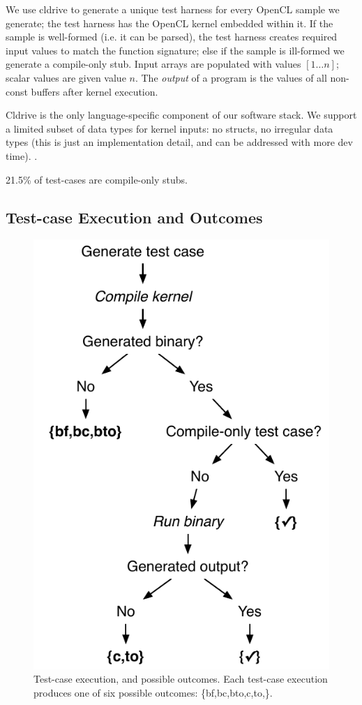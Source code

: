We use cldrive to generate a unique test harness for every OpenCL sample we generate; the test harness has the OpenCL kernel embedded within it. If the sample is well-formed (i.e. it can be parsed), the test harness creates required input values to match the function signature; else if the sample is ill-formed we generate a compile-only stub. Input arrays are populated with values {$[1 \ldots n]$}; scalar values are given value $n$. The \emph{output} of a program is the values of all non-const buffers after kernel execution.

Cldrive is the only language-specific component of our software stack. We support a limited subset of data types for kernel inputs: no structs, no irregular data types (this is just an implementation detail, and can be addressed with more dev time). .

21.5\% of test-cases are compile-only stubs.


\subsection{Test-case Execution and Outcomes}

\begin{figure}
	\centering %
	\includegraphics[width=.62\columnwidth]{img/test_process}%
	\caption{%
		Test-case execution, and possible outcomes. Each test-case execution produces one of six possible outcomes: \{bf,bc,bto,c,to,\cmark\}.%
	}%
	\label{fig:test-process} %
\end{figure}


